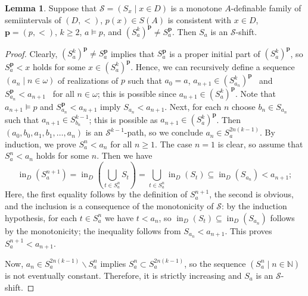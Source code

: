 \documentclass{amsart}
\theoremstyle{definition}
\newtheorem{Lemma}[Theorem]{Lemma}
\theoremstyle{definition}
\DeclareMathOperator{\supin}{in}
\begin{document}
\begin{Lemma}\label{Lemma monotone family not Ep determined is a shift}
Suppose that $\mathcal S=(S_x\mid x\in D)$ is a monotone $A$-definable family of semiintervals of $(D,<)$, $p(x)\in S(A)$ is consistent with $x\in D$, $\mathbf p=(p,<)$, $k\geqslant 2$, $a\models p$, and $(S_a^k)^{\mathbf p}\neq S^{\mathbf p}_a$. Then $S_a$ is an $\mathcal S$-shift.
\end{Lemma}
\begin{proof}Clearly, $(S_a^k)^{\mathbf p}\neq S^{\mathbf p}_a$  implies that $S^{\mathbf p}_a$ is a proper initial part of $(S_a^k)^{\mathbf p}$, so $S^{\mathbf p}_a<x$ holds for some $x\in (S_a^k)^{\mathbf p}$.
Hence, we can recursively define a sequence $(a_n\mid n\in \omega)$ of realizations of $p$ such that $a_0=a$, $a_{n+1}\in (S_{a_n}^k)^{\mathbf p}$ \ and \ $S^{{\mathbf p}}_{a_n}<a_{n+1}$ \ for all $n\in \omega$; this is possible since $a_{n+1}\in (S_a^k)^{\mathbf p}$. Note that $a_{n+1}\models p$ and $S^{{\mathbf p}}_{a_n}<a_{n+1}$ imply $S_{a_n}<a_{n+1}$. Next, for each $n$ choose $b_n\in S_{a_n}$ such that $a_{n+1}\in S_{b_n}^{k-1}$; this is possible as $a_{n+1}\in (S_a^k)^{\mathbf p}$. Then $(a_0,b_0,a_1,b_1,\ldots,a_n)$ is an $\mathcal S^{k-1}$-path, so we conclude $a_n\in S^{2n(k-1)}_{a}$. 
By induction, we prove $S_a^n<a_{n}$ for all $n\geqslant 1$. The case $n=1$ is clear, so assume that $S_a^{n}<a_{n}$ holds for some $n$. Then we have
\[\supin_D (S_a^{n+1})=\supin_D (\bigcup_{t\in S_a^n}S_t)= \bigcup_{t\in S_a^n}\supin_D (S_t)\subseteq \supin_D (S_{a_{n}})<a_{n+1};\] 
Here, the first equality follows by the definition of $S_a^{n+1}$, the second is obvious, and the inclusion is a consequence of the monotonicity of $\mathcal S$: by the induction hypothesis, for each $t\in S_a^n$ we have $t<a_{n}$, so $\supin_D (S_t)\subseteq \supin_D (S_{a_{n}})$ follows by the monotonicity; the inequality follows from $S_{a_{n}}<a_{n+1}$. This proves $S_a^{n+1}<a_{n+1}$. 

Now,  $a_n\in S^{2n(k-1)}_{a} \smallsetminus S_a^n$ implies $S_a^n\subset S_a^{2n(k-1)}$, so the sequence $(S_a^n\mid n\in \mathbb N)$ is not eventually constant. Therefore, it is strictly increasing and $S_a$ is an $\mathcal S$-shift. 
\end{proof} 
\end{document}
